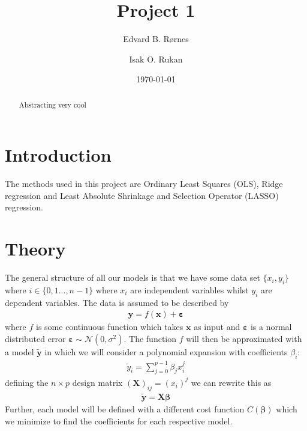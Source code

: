 \documentclass[%
reprint,
amsmath,amssymb,
aps,
]{revtex4-2}
\begin{document}
	
\title{Project 1}
\author{Edvard B. Rørnes}
\author{Isak O. Rukan}
\date{\today}

\begin{abstract}
	Abstracting very cool
\end{abstract}

\maketitle
\tableofcontents

\section{Introduction}
The methods used in this project are Ordinary Least Squares (OLS), Ridge regression and Least Absolute Shrinkage and Selection Operator (LASSO) regression. 

\section{Theory}
The general structure of all our models is that we have some data set $\{x_i,y_i\}$ where $i\in\{0,1...,n-1\}$ where $x_i$ are independent variables whilst $y_i$ are dependent variables. The data is assumed to be described by
\begin{align}
	\bm y=f(\bm x)+\bm \varepsilon
	\label{eq:data}
\end{align}
where $f$ is some continuous function which takes $\bm x$ as input and $\bm\varepsilon$ is a normal distributed error $\bm\varepsilon\sim\mathcal{N}(0,\sigma^2)$. The function $f$ will then be approximated with a model $\tilde{\bm y}$ in which we will consider a polynomial expansion with coefficients $\beta_i$:
\begin{align}
	\tilde{y}_i=\sum_{j=0}^{p-1}\beta_j x_i^j
\end{align}
defining the $n\times p$ design matrix $(\bm X)_{ij}=(x_i)^j$ we can rewrite this as
\begin{align}
	\tilde{\bm y}=\bm X\bm\beta
\end{align}
Further, each model will be defined with a different cost function $C(\bm\beta)$ which we minimize to find the coefficients for each respective model.
\end{document}

